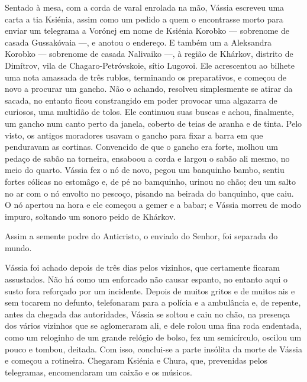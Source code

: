 Sentado à mesa, com a corda de varal enrolada na mão, Vássia escreveu
uma carta a tia Ksiénia, assim como um pedido a quem o encontrasse morto
para enviar um telegrama a Vorónej em nome de Ksiénia Korobko ---
sobrenome de casada Gussakóvaia ---, e anotou o endereço. E também um a
Aleksandra Korobko --- sobrenome de casada Nalivaiko ---, à região de
Khárkov, distrito de Dimítrov, vila de Chagaro-Petróvskoie, sítio
Lugovoi. Ele acrescentou ao bilhete uma nota amassada de três rublos,
terminando os preparativos, e começou de novo a procurar um gancho. Não
o achando, resolveu simplesmente se atirar da sacada, no entanto ficou
constrangido em poder provocar uma algazarra de curiosos, uma multidão
de tolos. Ele continuou suas buscas e achou, finalmente, um gancho num
canto perto da janela, coberto de teias de aranha e de tinta. Pelo
visto, os antigos moradores usavam o gancho para fixar a barra em que
penduravam as cortinas. Convencido de que o gancho era forte, molhou um
pedaço de sabão na torneira, ensaboou a corda e largou o sabão ali
mesmo, no meio do quarto. Vássia fez o nó de novo, pegou um banquinho
bambo, sentiu fortes cólicas no estomâgo e, de pé no bamquinho, urinou
no chão; deu um salto no ar com o nó envolto no pescoço, pisando na
beirada do banquinho, que caiu. O nó apertou na hora e ele começou a
gemer e a babar; e Vássia morreu de modo impuro, soltando um sonoro
peido de Khárkov.

Assim a semente podre do Anticristo, o enviado do Senhor, foi separada
do mundo.

Vássia foi achado depois de três dias pelos vizinhos, que certamente
ficaram assustados. Não há como um enforcado não causar espanto, no
entanto aqui o susto fora reforçado por um incidente. Depois de muitos
gritos e de muitos ais e sem tocarem no defunto, telefonaram para a
polícia e a ambulância e, de repente, antes da chegada das autoridades,
Vássia se soltou e caiu no chão, na presença dos vários vizinhos que se
aglomeraram ali, e dele rolou uma fina roda endentada, como um reloginho
de um grande relógio de bolso, fez um semicírculo, oscilou um pouco e
tombou, deitada. Com isso, conclui-se a parte insólita da morte de
Vássia e começou a rotineira. Chegaram Ksiénia e Chura, que, prevenidas
pelos telegramas, encomendaram um caixão e os músicos.

